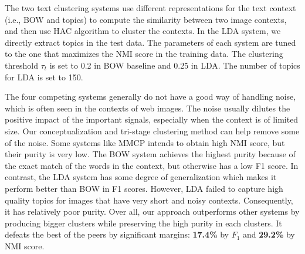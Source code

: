 
The two text clustering systems use different representations for the text
context (i.e., BOW and topics)
to compute the similarity between two image contexts, and then use
HAC algorithm to cluster the contexts.
In the LDA system, we directly extract topics in the test data.
The parameters of each system are tuned to the one that maximizes
the NMI score in the training data. The clustering threshold $\tau_t$ is set
to 0.2 in BOW baseline and 0.25 in LDA. The number of topics for LDA
is set to 150.

The four competing systems generally do not have
a good way of handling noise, which is often seen in the contexts of
web images. The noise usually dilutes the positive impact of the important
signals, especially when the context is of limited size. Our conceptualization
and tri-stage clustering method can help remove some of the noise.
Some systems like MMCP intends to obtain high NMI score,
but their purity is very low.
The BOW system achieves the highest purity because of the exact match of the
words in the context, but otherwise has a low F1 score.
In contrast, the LDA system has some degree of generalization which
makes it perform better than BOW in F1 scores.
However, LDA failed to capture high quality topics for images that
have very short and noisy contexts. Consequently, it has relatively
poor purity.
Over all, our approach outperforms other systems by
producing bigger clusters while preserving the high purity in each clusters.
It defeats the best of the peers
by significant margins: {\bf 17.4\%} by $F_1$ and {\bf 29.2\%} by NMI score.

